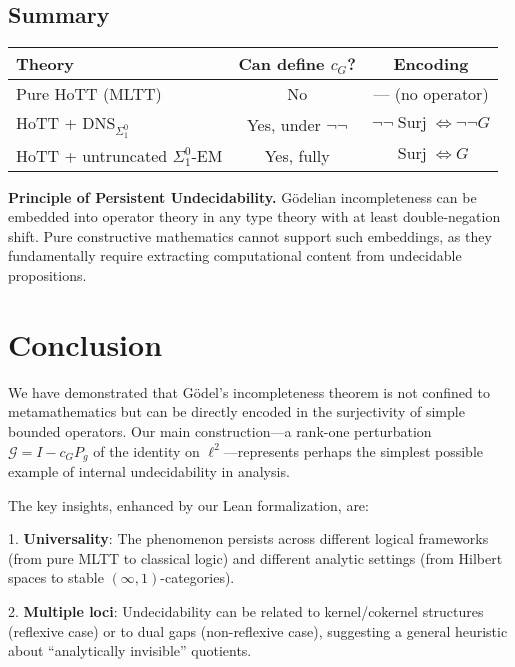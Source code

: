 \documentclass[11pt]{article}
\theoremstyle{definition}
\newcommand{\SigOne}{\Sigma^{0}_{\!1}}
\DeclareMathOperator{\Surj}{Surj}
\begin{document}
\subsection{Summary}

\begin{center}
\renewcommand{\arraystretch}{1.3}
\begin{tabular}{@{}lcc@{}}
\toprule
\textbf{Theory} & \textbf{Can define $c_G$?} & \textbf{Encoding} \\
\midrule
Pure HoTT (MLTT) & No & --- (no operator) \\
HoTT + DNS$_{\SigOne}$ & Yes, under $\neg\neg$ & $\neg\neg\Surj \iff \neg\neg G$ \\
HoTT + untruncated $\SigOne$-EM & Yes, fully & $\Surj \iff G$ \\
\bottomrule
\end{tabular}
\end{center}

\begin{mdframed}[roundcorner=4pt]
\textbf{Principle of Persistent Undecidability.} Gödelian incompleteness can be embedded into operator theory in any type theory with at least double-negation shift. Pure constructive mathematics cannot support such embeddings, as they fundamentally require extracting computational content from undecidable propositions.
\end{mdframed}

\section{Conclusion}

We have demonstrated that Gödel's incompleteness theorem is not confined to metamathematics but can be directly encoded in the surjectivity of simple bounded operators. Our main construction---a rank-one perturbation $\mathcal{G} = I - c_G P_g$ of the identity on $\ell^2$---represents perhaps the simplest possible example of internal undecidability in analysis.

The key insights, enhanced by our Lean formalization, are:

1. \textbf{Universality}: The phenomenon persists across different logical frameworks (from pure MLTT to classical logic) and different analytic settings (from Hilbert spaces to stable $(\infty,1)$-categories).

2. \textbf{Multiple loci}: Undecidability can be related to kernel/cokernel structures (reflexive case) or to dual gaps (non-reflexive case), suggesting a general heuristic about ``analytically invisible'' quotients.
\end{document}
